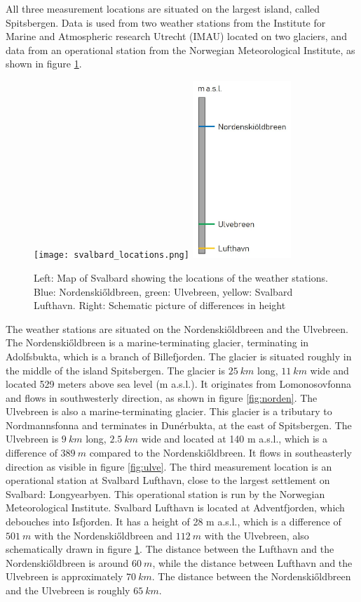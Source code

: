 \documentclass[11pt]{report}
\begin{document}
All three measurement locations are situated on the largest island, called Spitsbergen. Data is used from two weather stations from the Institute for Marine and Atmospheric research Utrecht (IMAU) located on two glaciers, and data from an operational station from the Norwegian Meteorological Institute, as shown in figure \ref{fig:locations}.

\begin{figure}[h]
\texttt{[image: svalbard\_locations.png]}
\includegraphics[scale=1, width=0.33\textwidth]{height.jpg}
\centering{}
\caption{Left: Map \cite{NPI} of Svalbard showing the locations of the weather stations. Blue: Nordenski\H{o}ldbreen, green: Ulvebreen, yellow: Svalbard Lufthavn. Right: Schematic picture of differences in height}
\label{fig:locations}
\end{figure}

The weather stations are situated on the Nordenski\H{o}ldbreen and the Ulvebreen. The Nordenski\H{o}ldbreen is a marine-terminating glacier, terminating in Adolfsbukta, which is a branch of Billefjorden. The glacier is situated roughly in the middle of the island Spitsbergen. The glacier is $\SI{25}{km}$ long, $\SI{11}{km}$ wide and located 529 meters above sea level (m a.s.l.). It originates from Lomonosovfonna and flows in southwesterly direction, as shown in figure \ref{fig:norden}. The Ulvebreen is also a marine-terminating glacier. This glacier is a tributary to Nordmannsfonna and terminates in Dunérbukta, at the east of Spitsbergen. The Ulvebreen is $\SI{9}{km}$ long, $\SI{2.5}{km}$ wide and located at 140 m a.s.l., which is a difference of $\SI{389}{m}$ compared to the Nordenski\H{o}ldbreen. It flows in southeasterly direction as visible in figure \ref{fig:ulve}. The third measurement location is an operational station at Svalbard Lufthavn, close to the largest settlement on Svalbard: Longyearbyen. This operational station is run by the Norwegian Meteorological Institute. Svalbard Lufthavn is located at Adventfjorden, which debouches into Isfjorden. It has a height of 28 m a.s.l., which is a difference of $\SI{501}{m}$ with the Nordenski\H{o}ldbreen and $\SI{112}{m}$ with the Ulvebreen, also schematically drawn in figure \ref{fig:locations}. The distance between the Lufthavn and the Nordenski\H{o}ldbreen is around $\SI{60}{m}$, while the distance between Lufthavn and the Ulvebreen is approximately $\SI{70}{km}$. The distance between the Nordenski\H{o}ldbreen and the Ulvebreen is roughly $\SI{65}{km}$. 
\end{document}
